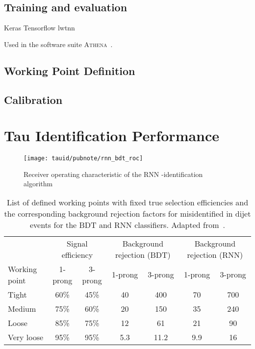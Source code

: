 \subsection{Training and evaluation}

Keras Tensorflow lwtnn \cite{lwtnn,keras,tensorflow2015-whitepaper,lstm}

Used in the software suite
\textsc{Athena}~\cite{ATL-SOFT-PUB-2021-001}.

\subsection{Working Point Definition}


\subsection{Calibration}


\section{Tau Identification Performance}

\begin{figure}[htbp]
  \centering

  \texttt{[image: tauid/pubnote/rnn\_bdt\_roc]}

  \caption{Receiver operating characteristic of the RNN
    \tauhad-identification algorithm \cite{ATL-PHYS-PUB-2019-033}}
  \label{fig:tauid_rnn_bdt_roc_comparison}
\end{figure}


\begin{table}
  \centering

  \caption{List of defined working points with fixed true \tauhadvis
    selection efficiencies and the corresponding background rejection
    factors for misidentified \tauhadvis in dijet events for the BDT
    and RNN classifiers. Adapted from~\cite{ATL-PHYS-PUB-2019-033}.}%
  \label{tab:rnn_wps}

  \begin{tabular}{lcccccc}
    \toprule
                  & \multicolumn{2}{c}{Signal efficiency} & \multicolumn{2}{c}{Background rejection (BDT)} & \multicolumn{2}{c}{Background rejection (RNN)} \\
    Working point  & 1-prong & 3-prong & 1-prong & 3-prong & 1-prong & 3-prong \\
    \midrule
    Tight          & 60\%    & 45\%    & 40      & 400  & 70   & 700 \\
    Medium         & 75\%    & 60\%    & 20      & 150  & 35   & 240 \\
    Loose          & 85\%    & 75\%    & 12      & 61   & 21   & 90  \\
    Very loose     & 95\%    & 95\%    & 5.3     & 11.2 & 9.9  & 16  \\
    \bottomrule
  \end{tabular}
\end{table}

